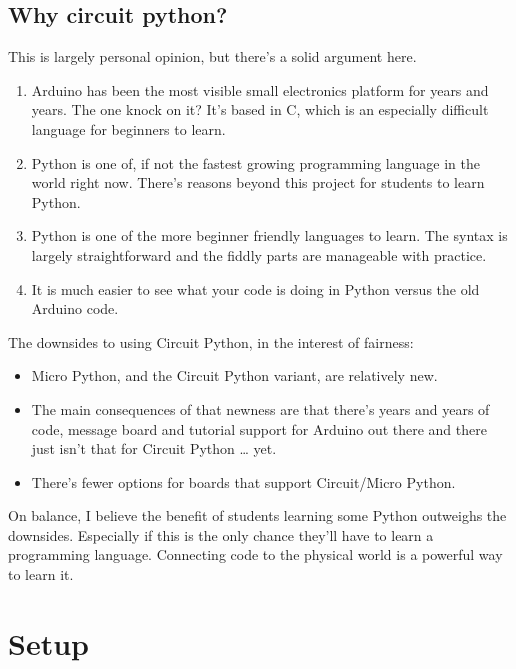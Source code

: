 \documentclass[
]{book}
\providecommand{\tightlist}{%
  \setlength{\itemsep}{0pt}\setlength{\parskip}{0pt}}
\begin{document}
\hypertarget{why-circuit-python}{%
\section{Why circuit python?}\label{why-circuit-python}}

This is largely personal opinion, but there's a solid argument here.

\begin{enumerate}
\def\labelenumi{\arabic{enumi}.}
\tightlist
\item
  Arduino has been the most visible small electronics platform for years and years. The one knock on it? It's based in C, which is an especially difficult language for beginners to learn.
\item
  Python is one of, if not the fastest growing programming language in the world right now. There's reasons beyond this project for students to learn Python.
\item
  Python is one of the more beginner friendly languages to learn. The syntax is largely straightforward and the fiddly parts are manageable with practice.
\item
  It is much easier to see what your code is doing in Python versus the old Arduino code.
\end{enumerate}

The downsides to using Circuit Python, in the interest of fairness:

\begin{itemize}
\tightlist
\item
  Micro Python, and the Circuit Python variant, are relatively new.
\item
  The main consequences of that newness are that there's years and years of code, message board and tutorial support for Arduino out there and there just isn't that for Circuit Python \ldots{} yet.
\item
  There's fewer options for boards that support Circuit/Micro Python.
\end{itemize}

On balance, I believe the benefit of students learning some Python outweighs the downsides. Especially if this is the only chance they'll have to learn a programming language. Connecting code to the physical world is a powerful way to learn it.

\hypertarget{setup}{%
\chapter{Setup}\label{setup}}
\end{document}
